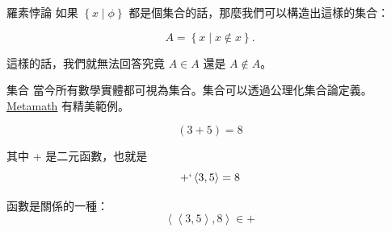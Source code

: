 \documentclass{Slideshow}
\begin{document}
\begin{frame}{羅素悖論}
    如果 $\left\{ x \middle| \phi \right\}$ 都是個集合的話，那麼我們可以構造出這樣的集合：

    \[ A = \left\{ x \middle| x \notin x \right\}.\]

    這樣的話，我們就無法回答究竟 $A \in A$ 還是 $A \notin A$。
\end{frame}

\begin{frame}{集合}
    當今所有數學實體都可視為集合。集合可以透過公理化集合論定義。
    \href{http://us.metamath.org/mpeuni/mmtheorems.html}{Metamath} 有精美範例。

    \begin{example}
        \[ \left( 3 + 5 \right) = 8 \]

        其中 + 是二元函數，也就是
        \[ +` \left\langle 3, 5 \right\rangle = 8 \]

        函數是關係的一種：
        \[ \left\langle \left\langle 3, 5 \right\rangle, 8 \right\rangle \in + \]
    \end{example}
\end{frame}
\end{document}
